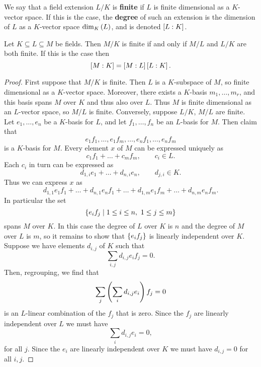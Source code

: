 \begin{definition}
We say that a field extension $ L / K $ is \textbf{finite} if $ L $ is finite dimensional as a $ K $-vector space. If this is the case, the \textbf{degree} of such an extension is the dimension of $ L $ as a $ K $-vector space $ \dim_K\rb{L} $, and is denoted $ \sb{L : K} $.
\end{definition}

\begin{proposition}
Let $ K \subseteq L \subseteq M $ be fields. Then $ M / K $ is finite if and only if $ M / L $ and $ L / K $ are both finite. If this is the case then
$$ \sb{M : K} = \sb{M : L}\sb{L : K}. $$
\end{proposition}

\begin{proof}
First suppose that $ M / K $ is finite. Then $ L $ is a $ K $-subspace of $ M $, so finite dimensional as a $ K $-vector space. Moreover, there exists a $ K $-basis $ m_1, \dots, m_r $, and this basis spans $ M $ over $ K $ and thus also over $ L $. Thus $ M $ is finite dimensional as an $ L $-vector space, so $ M / L $ is finite. Conversely, suppose $ L / K $, $ M / L $ are finite. Let $ e_1, \dots, e_n $ be a $ K $-basis for $ L $, and let $ f_1, \dots, f_n $ be an $ L $-basis for $ M $. Then claim that
$$ e_1f_1, \dots, e_1f_m, \dots, e_nf_1, \dots, e_nf_m $$
is a $ K $-basis for $ M $. Every element $ x $ of $ M $ can be expressed uniquely as
$$ c_1f_1 + \dots + c_mf_m, \qquad c_i \in L. $$
Each $ c_i $ in turn can be expressed as
$$ d_{1, i}e_1 + \dots + d_{n, i}e_n, \qquad d_{j, i} \in K. $$
Thus we can express $ x $ as
$$ d_{1, 1}e_1f_1 + \dots + d_{n, 1}e_nf_1 + \dots + d_{1, m}e_1f_m + \dots + d_{n, m}e_nf_m. $$
In particular the set
$$ \cb{e_if_j \mid 1 \le i \le n, \ 1 \le j \le m} $$
spans $ M $ over $ K $. In this case the degree of $ L $ over $ K $ is $ n $ and the degree of $ M $ over $ L $ is $ m $, so it remains to show that $ \cb{e_if_j} $ is linearly independent over $ K $. Suppose we have elements $ d_{i, j} $ of $ K $ such that
$$ \sum_{i, j} d_{i, j}e_if_j = 0. $$
Then, regrouping, we find that
$$ \sum_j \rb{\sum_i d_{i, j}e_i}f_j = 0 $$
is an $ L $-linear combination of the $ f_j $ that is zero. Since the $ f_j $ are linearly independent over $ L $ we must have
$$ \sum_i d_{i, j}e_i = 0, $$
for all $ j $. Since the $ e_i $ are linearly independent over $ K $ we must have $ d_{i, j} = 0 $ for all $ i, j $.
\end{proof}



